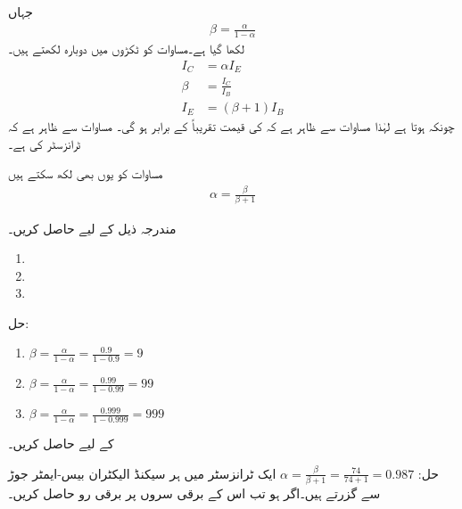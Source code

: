 جہاں
\begin{align} \label{مساوات_ٹرانزسٹر_افزائش_رو}
\beta = \frac{\alpha}{1-\alpha}
\end{align}
لکھا گیا ہے۔مساوات   کو ٹکڑوں میں دوبارہ لکھتے ہیں۔
\begin{align} 
I_C &=\alpha I_E  \label{مساوات_ٹرانزسٹر_کلکٹر _اور_مخارج_رو_برابر}\\
\beta&=\frac{I_C}{I_B} \label{مساوات_ٹرانزسٹر_افزائش}\\
I_E&=(\beta +1) I_B \label{مساوات_ٹرانزسٹر_مخارج_اور_قابو_رو}
\end{align}
چونکہ   ہوتا ہے لہٰذا مساوات   سے ظاہر ہے کہ   کی قیمت تقریباً   کے برابر ہو گی۔ مساوات   سے ظاہر ہے کہ  ٹرانزسٹر کی   ہے۔

	مساوات   کو یوں بھی لکھ سکتے ہیں
\begin{align} \label{مساوات_ٹرانزسٹر_بیٹا_سے_الفا} 
\alpha = \frac{\beta }{\beta +1}
\end{align}

 
مندرجہ ذیل کے لیے   حاصل کریں۔
\begin{enumerate}
\item
{}
\item
{}
\item
{}
\end{enumerate}
حل:
\begin{enumerate}
\item
$\beta = \frac{\alpha}{1-\alpha}=\frac{0.9}{1-0.9}=\num{9} $
\item
$\beta = \frac{\alpha}{1-\alpha}=\frac{0.99}{1-0.99}=\num{99} $
\item
$\beta = \frac{\alpha}{1-\alpha}=\frac{0.999}{1-0.999}=\num{999}$
\end{enumerate}


 کے لیے  حاصل کریں۔

حل:
$\alpha=\frac{\beta}{\beta+1} =\frac{74}{74+1}=\num{0.987}$
ایک ٹرانزسٹر میں ہر سیکنڈ   الیکٹران بیس-ایمٹر  جوڑ سے گزرتے ہیں۔اگر   ہو تب اس کے برقی سروں پر برقی رو حاصل کریں۔


